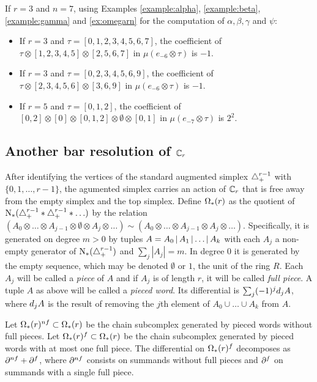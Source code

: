 \begin{example}\label{ex:omegarnfinal} If $r=3$ and $n=7$, using Examples \ref{example:alpha}, \ref{example:beta},  \ref{example:gamma} and \ref{ex:omegarn} for the computation of $\alpha,\beta,\gamma$ and $\psi$:
	\begin{itemize}
		\item If $r = 3$ and $\tau = [0,1,2,3,4,5,6,7]$, the coefficient of $\tau\otimes [1,2,3,4,5]\otimes [2,5,6,7]$ in $\mu(e_{-6}\otimes \tau)$ is $-1$.
		\item If $r = 3$ and $\tau = [0,2,3,4,5,6,9]$, the coefficient of $\tau\otimes [2,3,4,5,6]\otimes [3,6,9]$ in $\mu(e_{-6}\otimes \tau)$ is $-1$.
		\item If $r = 5$ and $\tau = [0,1,2]$, the coefficient of $[0,2]\otimes [0]\otimes [0,1,2]\otimes \emptyset\otimes [0,1]$ in $\mu(e_{-7}\otimes \tau)$ is $2^2$.
	\end{itemize}
\end{example}

\subsection{Another bar resolution of \texorpdfstring{$\mathbb{C}_r$}{the cyclic group}}

After identifying the vertices of the standard augmented simplex $\triangle_{+}^{r-1}$ with $\{0,1,\ldots,r-1\}$, the agumented simplex carries an action of $\mathbb{C}_r$ that is free away from the empty simplex and the top simplex. Define $\operatorname{\Omega}_{*}(r)$ as the quotient of $\operatorname{N}_{*}(\triangle_{+}^{r-1}*\triangle_{+}^{r-1}*\ldots)$ by the relation $(A_0\otimes \ldots \otimes A_{j-1}\otimes \emptyset \otimes A_j\otimes \ldots) \sim (A_0\otimes \ldots \otimes A_{j-1}\otimes A_j \otimes \ldots)$. Specifically, it is generated on degree $m>0$ by tuples $A = A_0\operatorname{|} A_1\operatorname{|}\ldots \operatorname{|} A_k$ with each $A_j$ a non-empty generator of $\operatorname{N}_{*}(\triangle_{+}^{r-1})$ and $\sum_j |A_j| = m$. In degree $0$ it is generated by the empty sequence, which may be denoted $\emptyset$ or $1$, the unit of the ring $R$. Each $A_j$ will be called a \emph{piece} of $A$ and if $A_j$ is of length $r$, it will be called \emph{full piece}. A tuple $A$ as above will be called a \emph{pieced word}. Its differential is $\sum_{j} (-1)^j d_j A$, where $d_jA$ is the result of removing the $j$th element of $A_0\cup \ldots\cup A_k$ from $A$. 

Let $\operatorname{\Omega}_{*}(r)^{nf}\subset \operatorname{\Omega}_{*}(r)$ be the chain subcomplex generated by pieced words without full pieces. Let $\operatorname{\Omega}_{*}(r)^{f}\subset \operatorname{\Omega}_{*}(r)$ be the chain subcomplex generated by pieced words with at most one full piece. The differential on $\operatorname{\Omega}_{*}(r)^{f}$ decomposes as $\partial^{nf}+\partial^{f}$, where $\partial^{nf}$ consists on summands without full pieces and $\partial^{f}$ on summands with a single full piece.

